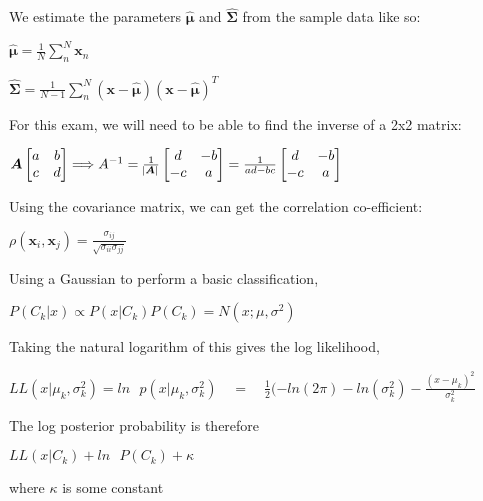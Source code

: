 \documentclass[10pt,a4paper]{article}
\newcommand{\bh}[1]{\bm{\hat{#1}}}
\newcommand{\re}[1]{\frac{1}{#1}}
\begin{document}
		We estimate the parameters $ \bm{\hat{\mu} } $ and $\bm{\hat{\Sigma}}$ from the sample data like so:
		
		\begin{center}
			$
				\bm{\hat{\mu}} = \frac{1}{N}\sum\limits_{n}^{N}\bm x_n
			$
				
			$
				\bm{\hat{\Sigma}} = \frac{1}{N-1}\sum\limits_n^N(\bm x - \bh{\mu})(\bm x - \bh{\mu})^T 
			$
		\end{center}
		
		For this exam, we will need to be able to find the inverse of a 2x2 matrix:
		
		\begin{center}
			$
				\bm A  \begin{bmatrix} a & b \\ c & d \end{bmatrix} 
				\Longrightarrow A^{-1}  = 
				\frac{1}{\abs{\bm A}} 
				\begin{bmatrix} d & -b \\ -c & a \end{bmatrix}
				=
				\frac{1}{ad-bc} 
				\begin{bmatrix} d & -b \\ -c & a \end{bmatrix}
			$
		\end{center}
		
		Using the covariance matrix, we can get the correlation co-efficient:
		
		\begin{center}
		\Large	$
				\rho(\bm x_i, \bm x_j) = \frac{\sigma_{ij}}{\sqrt{\sigma_{ii}\sigma_{jj}}}
			$
		\end{center}
		
		
		Using a Gaussian to perform a basic classification, 
		
		\begin{center}
			$ P(C_k|x) \propto P(x|C_k)P(C_k) = N(x;\mu, \sigma^2)$
		\end{center}
			Taking the natural logarithm of this gives the log likelihood,
			
			\begin{center}
				$
					LL(x|\mu_k, \sigma_k^2) = ln \text{ } p(x|\mu_k, \sigma_k^2)	
					\quad = \quad \re{2}(-ln(2\pi) - ln(\sigma_k^2) - \frac{(x -  \mu_k)^2}{\sigma_k^2}
				$
			\end{center}
			
			The log posterior probability is therefore 
			
			\begin{center}
				$ LL(x|C_k) + ln \text{ }P(C_k) + \kappa $
			\end{center}
			where $\kappa$ is some constant
			
\end{document}
